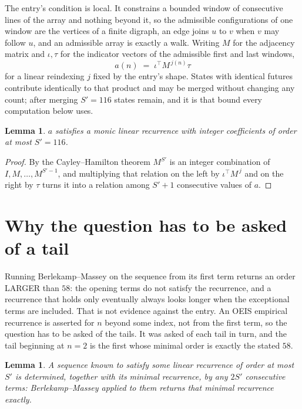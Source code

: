 \documentclass[11pt,a4paper]{article}
\theoremstyle{plain}
\newtheorem{lemma}[theorem]{Lemma}
\theoremstyle{definition}
\begin{document}
The entry's condition is local. It constrains a bounded window of consecutive lines of the
array and nothing beyond it, so the admissible configurations of one window are the vertices of
a finite digraph, an edge joins $u$ to $v$ when $v$ may follow $u$, and an admissible array is
exactly a walk. Writing $M$ for the adjacency matrix and $\iota,\tau$ for the indicator vectors
of the admissible first and last windows,
\[
a(n)\;=\;\iota^{\!\top}M^{\,j(n)}\tau
\]
for a linear reindexing $j$ fixed by the entry's shape. States with identical futures
contribute identically to that product and may be merged without changing any count; after
merging $S'=116$ states remain, and it is that bound every computation below uses.

\begin{lemma}\label{lem:cf}
$a$ satisfies a monic linear recurrence with integer coefficients of order at most $S'=116$.
\end{lemma}

\begin{proof}
By the Cayley--Hamilton theorem $M^{S'}$ is an integer combination of $I,M,\dots,M^{S'-1}$,
and multiplying that relation on the left by $\iota^{\!\top}M^{\,j}$ and on the right by
$\tau$ turns it into a relation among $S'+1$ consecutive values of $a$.
\end{proof}

\section{Why the question has to be asked of a tail}

Running Berlekamp--Massey on the sequence from its first term returns an order LARGER than $58$: the opening terms do not satisfy the recurrence, and a recurrence that holds only eventually always looks longer when the exceptional terms are included. That is not evidence against the entry. An OEIS empirical recurrence is asserted for $n$ beyond some index, not from the first term, so the question has to be asked of the tails. It was asked of each tail in turn, and the tail beginning at $n=2$ is the first whose minimal order is exactly the stated $58$.

\begin{lemma}\label{lem:bm}
A sequence known to satisfy some linear recurrence of order at most $S'$ is determined,
together with its minimal recurrence, by any $2S'$ consecutive terms: Berlekamp--Massey applied
to them returns that minimal recurrence exactly.
\end{lemma}
\end{document}
